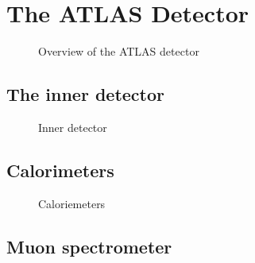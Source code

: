 \section{The ATLAS Detector}

\cite{PERF-2007-01}

\begin{figure}[htbp]
  \centering

  \caption{Overview of the ATLAS detector}
  \label{fig:atlas_detector_overview}
\end{figure}

\subsection{The inner detector}

\begin{figure}[htbp]
  \centering

  \caption{Inner detector}
  \label{fig:atlas_inner_detector}
\end{figure}


\subsection{Calorimeters}

\begin{figure}[htbp]
  \centering

  \caption{Caloriemeters}
  \label{fig:atlas_calorimeters}
\end{figure}


\subsection{Muon spectrometer}


